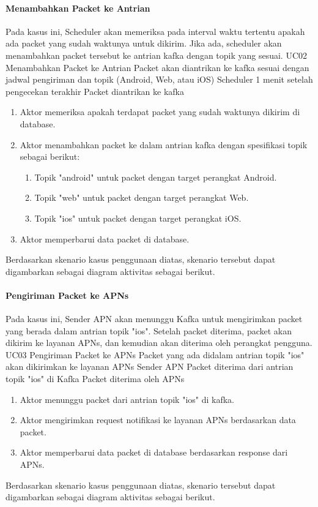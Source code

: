 \paragraph{Menambahkan Packet ke Antrian}
\par Pada kasus ini, Scheduler akan memeriksa pada interval waktu tertentu apakah ada packet yang sudah waktunya untuk
dikirim.
Jika ada, scheduler akan menambahkan packet tersebut ke antrian kafka dengan topik yang sesuai.
\tableUcDesc
{UC02}
{Menambahkan Packet ke Antrian}
{Packet akan diantrikan ke kafka sesuai dengan jadwal pengiriman dan topik (Android, Web, atau iOS)}
{Scheduler}
{1 menit setelah pengecekan terakhir}
{Packet diantrikan ke kafka}
{
\begin{enumerate}
    \item Aktor memeriksa apakah terdapat packet yang sudah waktunya dikirim di database.
    \item Aktor menambahkan packet ke dalam antrian kafka dengan spesifikasi topik sebagai berikut:
    \begin{enumerate}
        \item Topik "android" untuk packet dengan target perangkat Android.
        \item Topik "web" untuk packet dengan target perangkat Web.
        \item Topik "ios" untuk packet dengan target perangkat iOS.
    \end{enumerate}
    \item Aktor memperbarui data packet di database.
\end{enumerate}
}
\par Berdasarkan skenario kasus penggunaan diatas, skenario tersebut dapat digambarkan sebagai diagram aktivitas
sebagai berikut.

\paragraph{Pengiriman Packet ke APNs}
\par Pada kasus ini, Sender APN akan menunggu Kafka untuk mengirimkan packet yang berada dalam antrian topik "ios".
Setelah packet diterima, packet akan dikirim ke layanan APNs, dan kemudian akan diterima oleh perangkat pengguna.
\tableUcDesc
{UC03}
{Pengiriman Packet ke APNs}
{Packet yang ada didalam antrian topik "ios" akan dikirimkan ke layanan APNs}
{Sender APN}
{Packet diterima dari antrian topik "ios" di Kafka}
{Packet diterima oleh APNs}
{
\begin{enumerate}
    \item Aktor menunggu packet dari antrian topik "ios" di kafka.
    \item Aktor mengirimkan request notifikasi ke layanan APNs berdasarkan data packet.
    \item Aktor memperbarui data packet di database berdasarkan response dari APNs.
\end{enumerate}
}
\par Berdasarkan skenario kasus penggunaan diatas, skenario tersebut dapat digambarkan sebagai diagram aktivitas
sebagai berikut.

